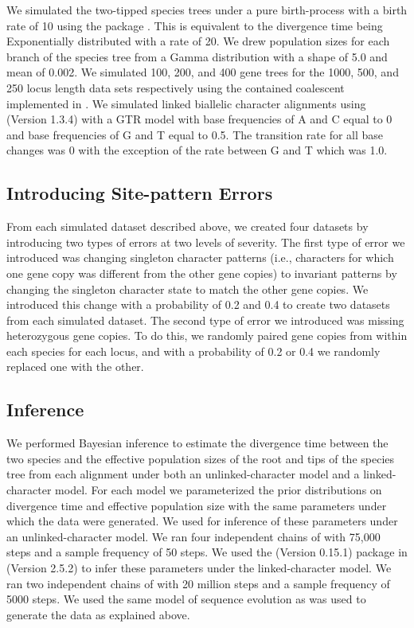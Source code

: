 We simulated the two-tipped species trees under a pure birth-process with a
birth rate of 10 using the \python package
\dendropy
\citep[Version 4.40;  branch commit eb69003;][]{Dendropy}.  
This is equivalent to the divergence time being Exponentially distributed with
a rate of 20.
We drew population sizes for each branch of the species tree from a Gamma 
distribution with a shape of 5.0 and mean of 0.002. We simulated 100, 200, and 
400 gene trees for the 1000, 500, and 250 locus length data sets respectively 
using the contained coalescent implemented in \dendropy.
We simulated linked biallelic character alignments using
\seqgen (Version 1.3.4)
\citep{rambautSeqGenApplicationMonte1997}
with a GTR model with base frequencies of A and C equal to 0 and base 
frequencies of G and T equal to 0.5. The transition rate for all base changes was 
0 with the exception of the rate between G and T which was 1.0. 

\subsection{Introducing Site-pattern Errors}
From each simulated dataset described above, we created four datasets by 
introducing two types of errors at two levels of severity. The first type of 
error we introduced was changing singleton character patterns (i.e., characters 
for which one gene copy was different from the other gene copies) to invariant 
patterns by changing the singleton character state to match the other gene 
copies. We introduced this change with a probability of 0.2 and 0.4 to create 
two datasets from each simulated dataset. The second type of error we introduced 
was missing heterozygous gene copies. To do this, we randomly paired gene copies 
from within each species for each locus, and with a probability 
of 0.2 or 0.4 we randomly replaced one with the other.


\subsection{Inference}
We performed Bayesian inference to estimate the divergence time between the two species and the effective 
population sizes of the root and tips of the species tree from each alignment 
under both an unlinked-character model and a linked-character model. For each 
model we parameterized the prior distributions on divergence time and effective
population size with the same parameters under which the data were generated. 
We used \ecoevolity
\citep[Version 0.3.2; dev branch commit a7e9bf2;][]{Oaks2018ecoevolity}
for inference of these parameters under an unlinked-character model.
We ran four independent chains of \ecoevolity with 75,000 steps and a sample 
frequency of 50 steps.
We used the \beast (Version 0.15.1) \citep{@ogilvieStarBEAST2BringsFaster2017} 
package in \beastcore (Version 2.5.2) \citep{@bouckaertBEASTSoftwarePlatform2014}
to infer these parameters under the linked-character model. 
We ran two independent chains of \beast with 20 million steps and a 
sample frequency of 5000 steps. 
We used the same model of sequence evolution as was used to generate the data
as explained above.


